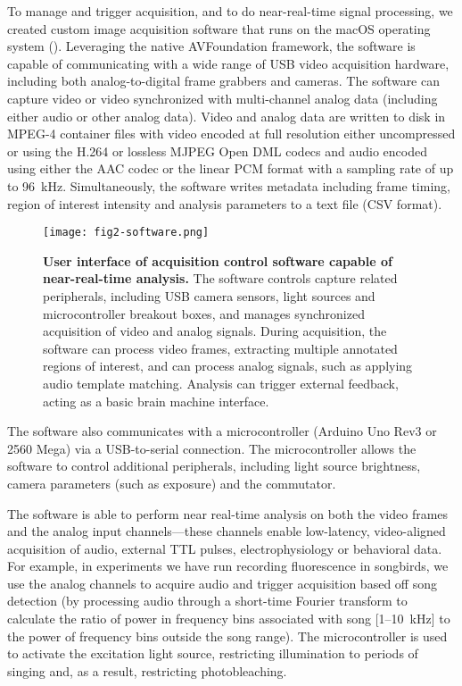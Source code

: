 To manage and trigger acquisition, and to do near-real-time signal
processing, we created custom image acquisition software that runs
on the macOS operating system (). Leveraging the 
native AVFoundation
framework, the software is capable of communicating with a wide 
range of USB video 
acquisition hardware, including both analog-to-digital frame 
grabbers and cameras. The software can capture video or video 
synchronized with multi-channel analog data (including 
either audio or other analog data). Video and analog data are 
written to disk in MPEG-4 container files with video encoded at 
full resolution either uncompressed or using the H.264 or lossless 
MJPEG Open DML codecs and audio encoded using either the AAC codec 
or the linear PCM format with a sampling rate of up to 
96~\si{\kilo\hertz}. Simultaneously, the software writes metadata 
including frame timing, region of interest intensity and analysis  
parameters to a text file (CSV format).

\begin{figure}
\texttt{[image: fig2-software.png]}
\caption[Software for capture near-real-time analysis]{\textbf{User interface of acquisition
control software capable of near-real-time analysis.} The software 
controls capture related peripherals, including USB camera sensors,
light sources and microcontroller breakout boxes, and manages 
synchronized acquisition of video and analog signals. During 
acquisition, the software can process video frames, extracting 
multiple annotated regions of interest, and can process analog 
signals, such as applying audio template matching. Analysis 
can trigger external feedback, acting as a basic brain machine 
interface.}
\label{fig:software}
\end{figure}

The software also communicates with a microcontroller 
(Arduino Uno Rev3 or 2560 Mega) via a USB-to-serial connection. The 
microcontroller allows the software to control additional 
peripherals, including light source brightness, camera parameters 
(such as exposure) and the commutator.

The software is able to perform near real-time analysis on both the 
video frames and the analog input channels---these channels enable
low-latency, video-aligned acquisition of audio, external TTL 
pulses, electrophysiology or behavioral data. 
For example, in experiments we have run recording fluorescence in songbirds, 
we use the analog channels to acquire audio and trigger acquisition 
based off song detection (by processing audio through a short-time
Fourier transform to calculate the ratio of power in frequency 
bins associated with song [1--10~kHz] to the power of frequency bins outside 
the song range). The microcontroller is used to activate 
the excitation light source, restricting illumination to periods of 
singing and, as a result, restricting photobleaching. 

